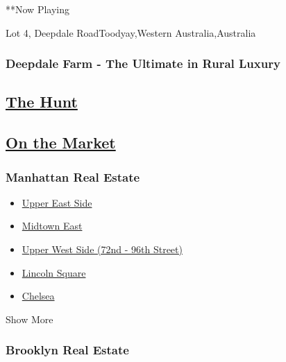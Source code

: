 \begin{itemize}
  **Now Playing

  Lot 4, Deepdale RoadToodyay,Western Australia,Australia

  \hypertarget{deepdale-farm---the-ultimate-in-rural-luxury}{%
  \subsubsection{Deepdale Farm - The Ultimate in Rural
  Luxury}\label{deepdale-farm---the-ultimate-in-rural-luxury}}
\end{itemize}

\hypertarget{the-hunt}{%
\subsection{\texorpdfstring{\href{https://www.nytimes.com/column/on-the-market}{The
Hunt}}{The Hunt}}\label{the-hunt}}

\hypertarget{on-the-market}{%
\subsection{\texorpdfstring{\href{https://www.nytimes.com/column/on-the-market}{On
the Market}}{On the Market}}\label{on-the-market}}

\hypertarget{manhattan-real-estate}{%
\subsubsection{Manhattan Real Estate}\label{manhattan-real-estate}}

\begin{itemize}
\tightlist
\item
  \href{/real-estate/usa/ny/new-york/upper-east-side/homes-for-sale}{Upper
  East Side}
\item
  \href{/real-estate/usa/ny/new-york/midtown-east/homes-for-sale}{Midtown
  East}
\item
  \href{/real-estate/usa/ny/new-york/upper-west-side-(72nd-96th-street)/homes-for-sale}{Upper
  West Side (72nd - 96th Street)}
\item
  \href{/real-estate/usa/ny/new-york/lincoln-square/homes-for-sale}{Lincoln
  Square}
\item
  \href{/real-estate/usa/ny/new-york/chelsea/homes-for-sale}{Chelsea}
\end{itemize}

Show More

\hypertarget{brooklyn-real-estate}{%
\subsubsection{Brooklyn Real Estate}\label{brooklyn-real-estate}}

